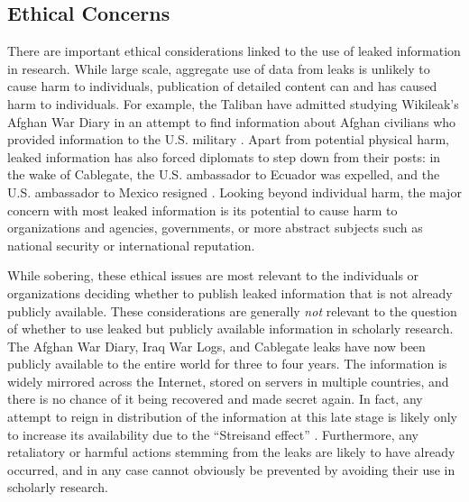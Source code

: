 \documentclass[12pt]{article}
\begin{document}
\subsection{Ethical Concerns}

There are important ethical considerations linked to the use of leaked information in research. 
While large scale, aggregate use of data from leaks is unlikely to cause harm to individuals, 
publication of detailed content can and has 
caused harm to individuals. For example, the Taliban have admitted studying Wikileak's 
Afghan War Diary in an attempt to find information about Afghan civilians who provided information 
to the U.S. military \citep{winnett2010wikileaks}. Apart from potential physical harm, 
leaked information 
has also forced diplomats to step down from their posts: in the wake of Cablegate, the 
U.S. ambassador to Ecuador was expelled, and the U.S. ambassador to Mexico 
resigned \citep{romero2011ecuador,associated_press2011us}. 
Looking beyond individual harm, the major concern with most leaked information is its potential to 
cause harm to organizations and agencies, governments, or more abstract subjects such as 
national security or international reputation.

While sobering, these ethical issues are most relevant to the individuals or organizations deciding 
whether to publish leaked 
information that is not already publicly available. These considerations are generally \emph{not} 
relevant 
to the question of whether to use leaked but publicly available information in scholarly research. 
The Afghan War Diary, Iraq 
War Logs, and Cablegate leaks have now been publicly available to the entire world for three to four 
years. The information is widely mirrored across the Internet, stored on servers in multiple countries, 
and there is no chance of it being 
recovered and made secret again. In fact, any attempt to reign in distribution of the information at this 
late stage is likely only to increase its availability due to the ``Streisand effect'' \citep{marton2010protecting}. 
Furthermore, any retaliatory or harmful actions stemming from the leaks are likely 
to have already occurred, and in any case cannot obviously be prevented by avoiding their use in scholarly 
research.
\end{document}
